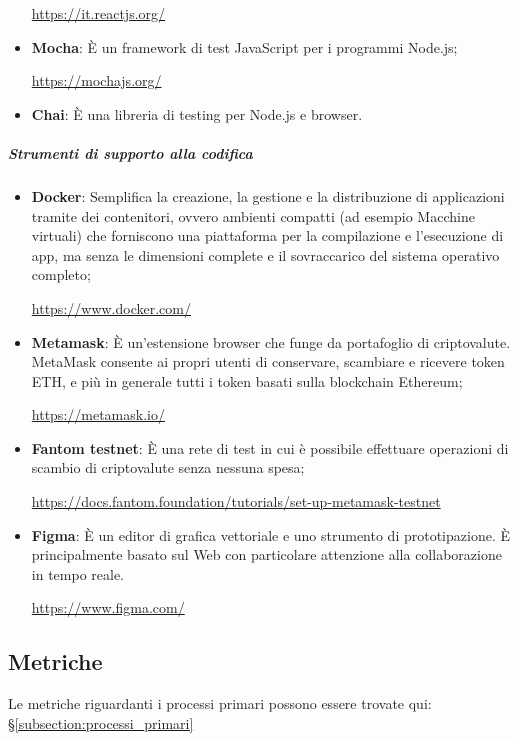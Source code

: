 \begin{itemize}
          \begin{center}\url{https://it.reactjs.org/}\end{center}
    \item \textbf{Mocha}: È un framework di test JavaScript\glo{} per i programmi Node.js;
          \begin{center}\url{https://mochajs.org/}\end{center}
    \item \textbf{Chai}: È una libreria di testing per Node.js e browser.
          \begin{center}\url{}\end{center}
\end{itemize}
\subparagraph{Strumenti di supporto alla codifica}
\begin{itemize}
    \item \textbf{Docker}: Semplifica la creazione, la gestione e la distribuzione di applicazioni tramite dei contenitori, ovvero ambienti compatti (ad esempio Macchine virtuali) che forniscono una piattaforma per la compilazione e l'esecuzione di app, ma senza le dimensioni complete e il sovraccarico del sistema operativo completo;
          \begin{center}\url{https://www.docker.com/}\end{center}
    \item \textbf{Metamask}: È un'estensione browser che funge da portafoglio di criptovalute\glo{}. MetaMask consente ai propri utenti di conservare, scambiare e ricevere token\glo{} ETH, e più in generale tutti i token\glo{} basati sulla blockchain\glo{} Ethereum\glo{};
          \begin{center}\url{https://metamask.io/}\end{center}
    \item \textbf{Fantom testnet}: È una rete di test in cui è possibile effettuare operazioni di scambio di criptovalute\glo{} senza nessuna spesa;
          \begin{center}\url{https://docs.fantom.foundation/tutorials/set-up-metamask-testnet}\end{center}
    \item \textbf{Figma}: È un editor di grafica vettoriale e uno strumento di prototipazione. È principalmente basato sul Web con particolare attenzione alla collaborazione in tempo reale.
          \begin{center}\url{https://www.figma.com/}\end{center}
\end{itemize}

\subsection{Metriche}
Le metriche riguardanti i processi primari possono essere trovate qui: §\ref{subsection:processi_primari}